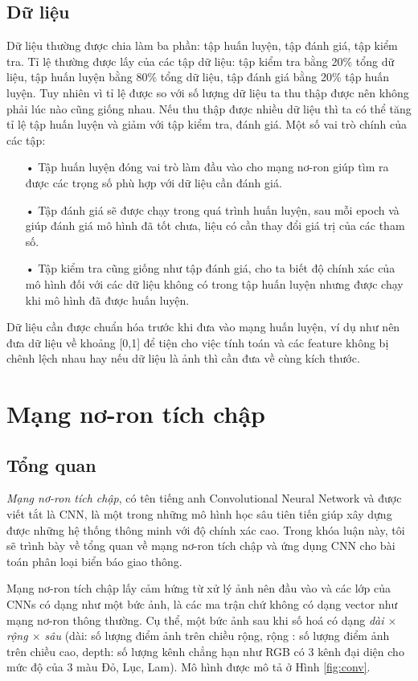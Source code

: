 \subsection{Dữ liệu}
Dữ liệu thường được chia làm ba phần: tập huấn luyện, tập đánh giá, tập kiểm tra. Tỉ lệ thường được lấy của các tập dữ liệu: tập kiểm tra bằng 20\% tổng dữ liệu, tập huấn luyện bằng 80\% tổng dữ liệu, tập đánh giá bằng 20\% tập huấn luyện. Tuy nhiên vì tỉ lệ được so với số lượng dữ liệu ta thu thập được nên không phải lúc nào cũng giống nhau. Nếu thu thập được nhiều dữ liệu thì ta có thể tăng tỉ lệ tập huấn luyện và giảm với tập kiểm tra, đánh giá. Một số vai trò chính của các tập:
\begin{itemize}
\item[•]Tập huấn luyện đóng vai trò làm đầu vào cho mạng nơ-ron giúp tìm ra được các trọng số phù hợp với dữ liệu cần đánh giá.
\item[•]Tập đánh giá sẽ được chạy trong quá trình huấn luyện, sau mỗi epoch và giúp đánh giá mô hình đã tốt chưa, liệu có cần thay đổi giá trị của các tham số.
\item[•]Tập kiểm tra cũng giống như tập đánh giá, cho ta biết độ chính xác của mô hình đối với các dữ liệu không có trong tập huấn luyện nhưng được chạy khi mô hình đã được huấn luyện.
\end{itemize}
Dữ liệu cần được chuẩn hóa trước khi đưa vào mạng huấn luyện, ví dụ như nên đưa dữ liệu về khoảng [0,1] để tiện cho việc tính toán và các feature không bị chênh lệch nhau hay nếu dữ liệu là ảnh thì cần đưa về cùng kích thước.
\section{Mạng nơ-ron tích chập}

\subsection{Tổng quan}
  \textit{Mạng nơ-ron tích chập}, có tên tiếng anh  Convolutional Neural Network và được viết tắt là CNN, là một trong những mô hình học sâu tiên tiến giúp xây dựng được những hệ thống thông minh với độ chính xác cao. Trong khóa luận này, tôi sẽ trình bày về tổng quan về mạng nơ-ron tích chập và ứng dụng CNN cho bài toán phân loại biển báo giao thông.\par
Mạng nơ-ron tích chập lấy cảm hứng từ xử lý ảnh nên đầu vào và các lớp của CNNs có dạng như một bức ảnh, là các ma trận chứ không có dạng vector như mạng nơ-ron thông thường. Cụ thể, một bức ảnh sau khi số hoá có dạng \textit{dài $\times$ rộng $\times$ sâu} (dài: số lượng điểm ảnh trên chiều rộng, rộng : số lượng điểm ảnh trên chiều cao, depth: số lượng kênh chẳng hạn như RGB có 3 kênh đại diện cho mức độ của 3 màu Đỏ, Lục, Lam). Mô hình được mô tả ở Hình \ref{fig:conv}.

